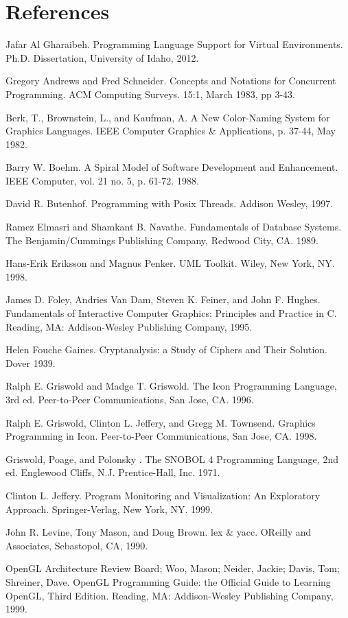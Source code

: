 \clearpage\section{References}

Jafar Al Gharaibeh. Programming Language Support for
Virtual Environments. Ph.D. Dissertation, University of Idaho, 2012.

Gregory Andrews and Fred Schneider. Concepts and
Notations for Concurrent Programming. ACM Computing Surveys. 15:1,
March 1983, pp 3-43.

Berk, T., Brownstein, L., and Kaufman, A. A New Color-Naming System for
Graphics Languages. IEEE Computer Graphics \& Applications, p. 37-44,
May 1982.

Barry W. Boehm. A Spiral Model of Software Development and Enhancement.
IEEE Computer, vol. 21 no. 5, p. 61-72. 1988.

David R. Butenhof. Programming with Posix Threads.
Addison Wesley, 1997.

Ramez Elmasri and Shamkant B. Navathe. Fundamentals of Database Systems.
The Benjamin/Cummings Publishing Company, Redwood City, CA. 1989.

Hans-Erik Eriksson and Magnus Penker. UML Toolkit. Wiley, New York, NY.
1998.

James D. Foley, Andries Van Dam, Steven K. Feiner, and John F. Hughes.
Fundamentals of Interactive Computer Graphics: Principles and Practice
in C. Reading, MA: Addison-Wesley Publishing Company, 1995.

Helen Fouche Gaines. {\textquotedbl}Cryptanalysis: a Study of Ciphers
and Their Solution{\textquotedbl}. Dover 1939.

Ralph E. Griswold and Madge T. Griswold. The Icon Programming Language,
3rd ed. Peer-to-Peer Communications, San Jose, CA. 1996.

Ralph E. Griswold, Clinton L. Jeffery, and Gregg M. Townsend. Graphics
Programming in Icon. Peer-to-Peer Communications, San Jose, CA. 1998.

Griswold, Poage, and Polonsky . The SNOBOL 4 Programming Language, 2nd
ed. Englewood Cliffs, N.J. Prentice-Hall, Inc. 1971.

Clinton L. Jeffery. Program Monitoring and Visualization: An Exploratory
Approach. Springer-Verlag, New York, NY. 1999.

John R. Levine, Tony Mason, and Doug Brown. lex \& yacc.
O{\textquotesingle}Reilly and Associates, Sebastopol, CA, 1990.

OpenGL Architecture Review Board; Woo, Mason; Neider, Jackie; Davis,
Tom; Shreiner, Dave. OpenGL Programming Guide: the Official Guide to
Learning OpenGL, Third Edition. Reading, MA: Addison-Wesley Publishing
Company, 1999.

